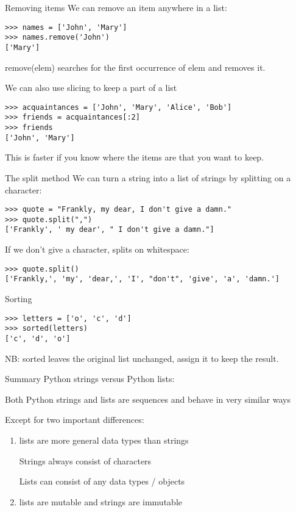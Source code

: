 \documentclass{beamer}
\begin{document}
\begin{frame}[fragile]{Removing items}
We can remove an item anywhere in a list:
\begin{lstlisting} 
>>> names = ['John', 'Mary']
>>> names.remove('John')
['Mary']
\end{lstlisting}

    remove(elem) searches for the first occurrence of elem
    and removes it.

\pause
We can also use slicing to keep a part of a list
\begin{lstlisting} 
>>> acquaintances = ['John', 'Mary', 'Alice', 'Bob']
>>> friends = acquaintances[:2]
>>> friends
['John', 'Mary']
\end{lstlisting}

This is faster if you know where the items are that you want to keep.
\end{frame}


\begin{frame}[fragile]{The split method}
We can turn a string into a list of strings
by splitting on a character:
\begin{lstlisting} 
>>> quote = "Frankly, my dear, I don't give a damn."
>>> quote.split(",")
['Frankly', ' my dear', " I don't give a damn."]
\end{lstlisting}

\pause
If we don't give a character, splits on whitespace:
\begin{lstlisting} 
>>> quote.split()
['Frankly,', 'my', 'dear,', 'I', "don't", 'give', 'a', 'damn.']
\end{lstlisting}
\end{frame}


\begin{frame}[fragile]{Sorting}
\begin{lstlisting} 
>>> letters = ['o', 'c', 'd']
>>> sorted(letters)
['c', 'd', 'o']
\end{lstlisting}

NB: sorted leaves the original list unchanged,
assign it to keep the result.
\end{frame}

\begin{frame}[fragile]{Summary}
Python strings versus Python lists:

Both Python strings and lists are sequences and behave in very similar ways

Except for two important differences:
\begin{enumerate}
\item lists are more general data types than strings

    Strings always consist of characters

    Lists can consist of any data types / objects

\item lists are mutable and strings are immutable
\end{enumerate}
\end{frame}
\end{document}

